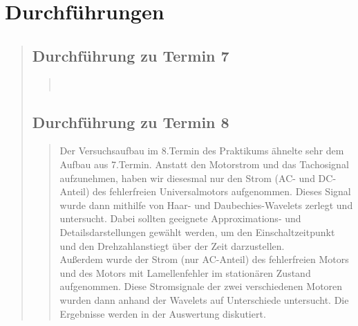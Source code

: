 \section{Durchführungen}
\begin{quote}

        \subsection{Durchführung zu Termin 7}
        \begin{quote}
            
             \\
            
        \end{quote}%

        \subsection{Durchführung zu Termin 8}
        \begin{quote}
        
            Der Versuchsaufbau im 8.Termin des Praktikums ähnelte sehr dem Aufbau aus 7.Termin. Anstatt den
            Motorstrom und das Tachosignal aufzunehmen, haben wir diesesmal nur den Strom
            (AC- und DC-Anteil) des fehlerfreien Universalmotors aufgenommen. Dieses
            Signal wurde dann mithilfe von Haar- und Daubechies-Wavelets zerlegt
            und untersucht. Dabei sollten geeignete Approximations- und
            Detailsdarstellungen gewählt werden, um den Einschaltzeitpunkt und
            den Drehzahlanstiegt über der Zeit darzustellen.\\
            
            Außerdem wurde der Strom (nur AC-Anteil) des fehlerfreien Motors
            und des Motors mit Lamellenfehler im stationären Zustand
            aufgenommen. Diese Stromsignale der zwei verschiedenen Motoren
            wurden dann anhand der Wavelets auf Unterschiede untersucht.
            Die Ergebnisse werden in der Auswertung diskutiert. 
        \end{quote}%

\end{quote}%


